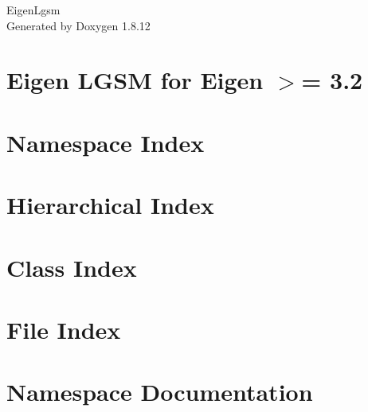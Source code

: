 \documentclass[twoside]{book}
\newcommand{\+}{\discretionary{\mbox{\scriptsize$\hookleftarrow$}}{}{}}
\newcommand{\clearemptydoublepage}{%
  \newpage{\pagestyle{empty}\cleardoublepage}%
}
\begin{document}
\hypersetup{pageanchor=false,
             bookmarksnumbered=true,
             pdfencoding=unicode
            }
\begin{titlepage}
\vspace*{7cm}
\begin{center}%
{\Large Eigen\+Lgsm }\\
\vspace*{1cm}
{\large Generated by Doxygen 1.8.12}\\
\end{center}
\end{titlepage}
\clearemptydoublepage
{}
\tableofcontents
\clearemptydoublepage
{}
\hypersetup{pageanchor=true}

\chapter{Eigen L\+G\+SM for Eigen $>$= 3.2}
\label{index}\hypertarget{index}{}
\chapter{Namespace Index}

\chapter{Hierarchical Index}

\chapter{Class Index}

\chapter{File Index}

\chapter{Namespace Documentation}

\end{document}
